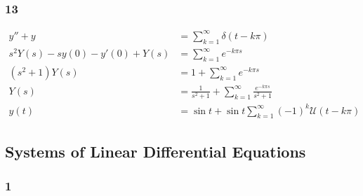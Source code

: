 \documentclass{article}
\begin{document}
\subsubsection{13}

\begin{align*}
  y'' + y                          & = \sum_{k = 1}^\infty \delta(t - k \pi)                                \\
  s^2 Y(s) - s y(0) - y'(0) + Y(s) & = \sum_{k = 1}^\infty e^{-k \pi s}                                     \\
  (s^2 + 1) Y(s)                   & = 1 + \sum_{k = 1}^\infty e^{-k \pi s}                                 \\
  Y(s)                             & = \frac{1}{s^2 + 1} + \sum_{k = 1}^\infty \frac{e^{-k \pi s}}{s^2 + 1} \\
  y(t)                             & = \sin t + \sin t \sum_{k = 1}^\infty (-1)^k \mathcal{U}(t - k \pi)
\end{align*}

\subsection{Systems of Linear Differential Equations}

\subsubsection{1}
\end{document}
